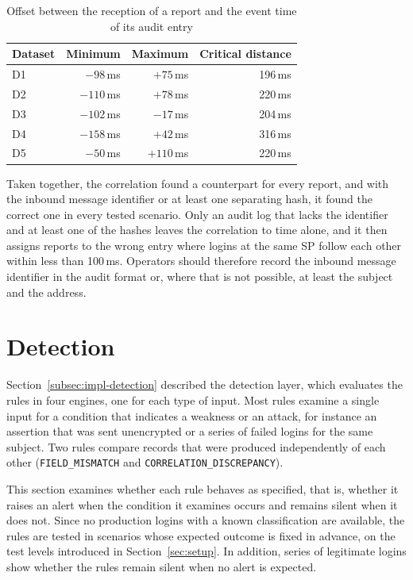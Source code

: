 \documentclass[../main.tex]{subfiles}
\begin{document}
\begin{table}[h]
\centering
\caption{Offset between the reception of a report and the event time of its audit entry}\label{tab:correlation-offset}
\small
\begin{tabular}{lrrr}
\toprule
Dataset & Minimum & Maximum & Critical distance \\
\midrule
D1 & $-98$\,ms  & $+75$\,ms  & 196\,ms \\
D2 & $-110$\,ms & $+78$\,ms  & 220\,ms \\
D3 & $-102$\,ms & $-17$\,ms  & 204\,ms \\
D4 & $-158$\,ms & $+42$\,ms  & 316\,ms \\
D5 & $-50$\,ms  & $+110$\,ms & 220\,ms \\
\bottomrule
\end{tabular}
\end{table}

Taken together, the correlation found a counterpart for every report, and with the inbound message 
identifier or at least one separating hash, it found the correct one in every tested scenario. 
Only an audit log that lacks the identifier and at least one of the hashes leaves the correlation to time 
alone, and it then assigns reports to the wrong entry where logins at the same SP follow each other 
within less than 100\,ms. 
Operators should therefore record the inbound message identifier in the audit format or, where 
that is not possible, at least the subject and the address. 

\section{Detection}\label{sec:eval-detection}

Section~\ref{subsec:impl-detection} described the detection layer, which evaluates the rules in 
four engines, one for each type of input. 
Most rules examine a single input for a condition that indicates a weakness or an attack, for 
instance an assertion that was sent unencrypted or a series of failed logins for the same subject. 
Two rules compare records that were produced independently of each other (\texttt{FIELD\_\allowbreak{}MISMATCH} 
and \texttt{CORRELATION\_\allowbreak{}DISCREPANCY}). 

This section examines whether each rule behaves as specified, that is, whether it raises an alert 
when the condition it examines occurs and remains silent when it does not. 
Since no production logins with a known classification are available, the rules are tested in 
scenarios whose expected outcome is fixed in advance, on the test levels introduced in Section~\ref{sec:setup}. 
In addition, series of legitimate logins show whether the rules remain silent when no alert is expected. 
\end{document}
